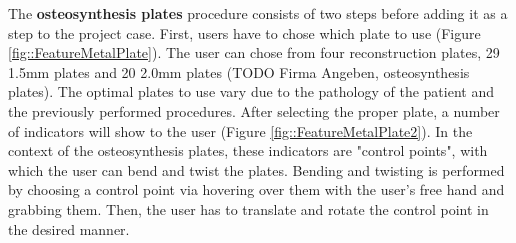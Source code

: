 The \textbf{osteosynthesis plates} procedure consists of two steps before adding it as a step to the project case.
First, users have to chose which plate to use (Figure \ref{fig::FeatureMetalPlate}).
The user can chose from four reconstruction plates, 29 1.5mm plates and 20 2.0mm plates (TODO Firma Angeben, osteosynthesis plates).
The optimal plates to use vary due to the pathology of the patient and the previously performed procedures.
After selecting the proper plate, a number of indicators will show to the user (Figure \ref{fig::FeatureMetalPlate2}).
In the context of the osteosynthesis plates, these indicators are "control points", with which the user can bend and twist the plates.
Bending and twisting is performed by choosing a control point via hovering over them with the user's free hand and grabbing them.
Then, the user has to translate and rotate the control point in the desired manner.
